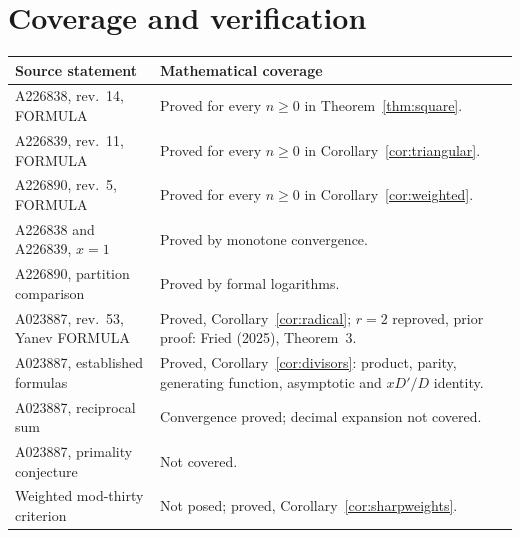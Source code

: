 \documentclass[11pt]{article}
\begin{document}
\section{Coverage and verification}

\begin{center}
\small
\begin{tabular}{@{}>{\raggedright\arraybackslash}p{.32\linewidth}>{\raggedright\arraybackslash}p{.59\linewidth}@{}}
\toprule
Source statement&Mathematical coverage\\\midrule
A226838, rev.\ 14, FORMULA&Proved for every $n\geq0$ in Theorem~\ref{thm:square}.\\
A226839, rev.\ 11, FORMULA&Proved for every $n\geq0$ in Corollary~\ref{cor:triangular}.\\
A226890, rev.\ 5, FORMULA&Proved for every $n\geq0$ in Corollary~\ref{cor:weighted}.\\
A226838 and A226839, $x=1$&Proved by monotone convergence.\\
A226890, partition comparison&Proved by formal logarithms.\\
A023887, rev.\ 53, Yanev FORMULA&Proved, Corollary~\ref{cor:radical}; $r=2$ reproved, prior proof: Fried (2025), Theorem~3.\\
A023887, established formulas&Proved, Corollary~\ref{cor:divisors}: product, parity, generating function, asymptotic and $xD'/D$ identity.\\
A023887, reciprocal sum&Convergence proved; decimal expansion not covered.\\
A023887, primality conjecture&Not covered.\\
Weighted mod-thirty criterion&Not posed; proved, Corollary~\ref{cor:sharpweights}.\\
\bottomrule
\end{tabular}
\end{center}
\end{document}
